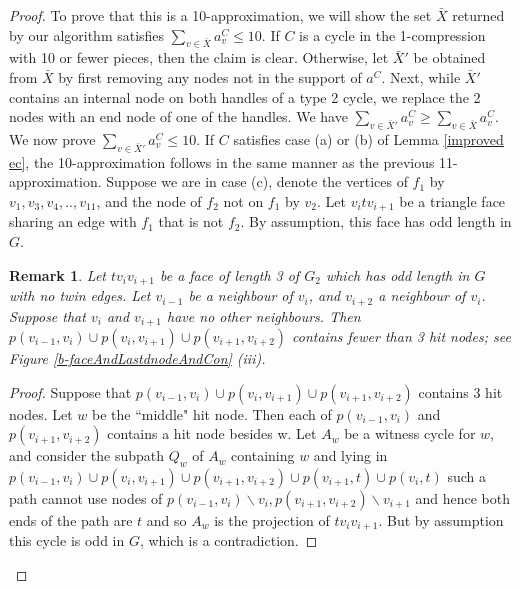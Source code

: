 \documentclass{article}
\newcommand{\0}{\mathbb{0}}
\newcommand{\1}{\mathbb{1}}
\newtheorem{remark}[theorem]{Remark}
\begin{document}
\begin{proof} 
To prove that this is a 10-approximation, we will show the set $\bar{X}$ returned by our algorithm satisfies $\sum_{v\in \bar{X}} a_v^C  \leq 10 $. If $C$ is a cycle in the 1-compression with 10 or fewer pieces, then the claim is clear.  Otherwise, let $\bar{X}'$ be obtained from $\bar{X}$ by first removing any nodes not in the support of $a^C$.  Next, while $ \bar{X}'$ contains  an internal node on both handles of a type 2 cycle, we replace the 2 nodes with an end node of one of the handles.  We have $\sum_{v\in \bar{X}'} a_v^C \geq \sum_{v \in \bar{X}} a_v^C$. We now prove $\sum_{v\in \bar{X}'} a_v^C \leq 10$.
If $C$ satisfies case (a) or (b) of Lemma \ref{improved ec},  the 10-approximation follows in the same manner as the previous 11-approximation.  Suppose we are in case (c), denote the vertices of $f_1$ by  $v_1,v_3,v_4 ,.., v_{11}$, and the node of $f_2$ not on $f_1$ by $v_2$.  Let $v_i t v_{i+1}$ be a triangle face sharing an edge with $f_1$ that is not $f_2$. By assumption, this face has odd length in $G$.
\begin{remark}\label{consecutive}
Let $ t v_i v_{i+1} $ be a face of length 3 of $G_2$ which has odd length in $G$ with no twin edges. Let $ v_{i-1} $ be a neighbour of $v_i$, and $v_{i+2}$ a neighbour of $v_i$. Suppose that $v_i $ and $v_{i+1}$ have no other neighbours. Then  $ p(v_{i-1} , v_i ) \cup p(v_i,v_{i+1} ) \cup p(v_{i+1},v_{i+2} ) $  contains fewer than 3 hit nodes; see Figure \ref{b-faceAndLastdnodeAndCon} (iii).
\end{remark}
\begin{proof}
 Suppose that $ p(v_{i-1} , v_i ) \cup p(v_i,v_{i+1} ) \cup p(v_{i+1},v_{i+2} ) $ contains 3 hit nodes. Let $w$ be the  ``middle" hit node. Then each of $ p(v_{i-1} , v_i ) $ and $ p(v_{i+1},v_{i+2} ) $ contains a hit node besides w. Let $A_w$ be a witness cycle for $w$, and consider the subpath $ Q_w$ of $A_w$ containing $w $ and lying in $ p(v_{i-1} , v_i ) \cup p(v_i,v_{i+1} ) \cup p(v_{i+1},v_{i+2} ) \cup p(v_{i+1},t) \cup p(v_i,t)  $  such a path cannot use nodes of $ p(v_{i-1} , v_i ) \backslash v_i ,p(v_{i+1},v_{i+2} ) \backslash v_{i+1} $  and hence both ends of the path are  $t$ and so $A_w$ is the projection of $t v_i v_{i+1} $. But by assumption this cycle is odd in $G$, which is a contradiction.  
\end{proof} 


\end{proof}
\end{document}
